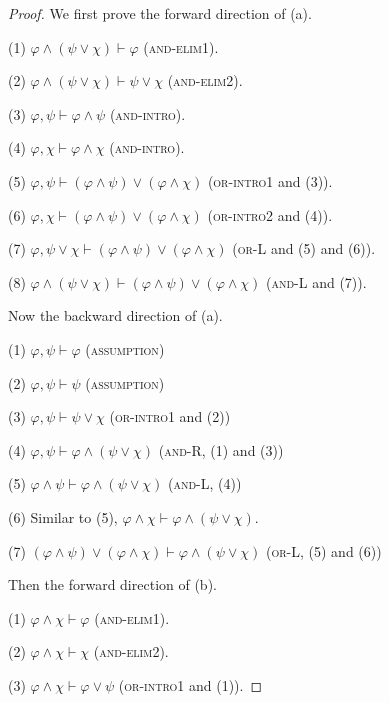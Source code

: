 \begin{proof}
    We first prove the forward direction of (a). 

    (1) $\varphi\wedge(\psi\vee\chi)\vdash\varphi$ (\textsc{and-elim1}). 
    
    (2) $\varphi\wedge(\psi\vee\chi)\vdash\psi\vee\chi$ (\textsc{and-elim2}). 
    
    (3) $\varphi,\psi\vdash\varphi\wedge\psi$ (\textsc{and-intro}). 
    
    (4) $\varphi,\chi\vdash\varphi\wedge\chi$ (\textsc{and-intro}). 
    
    (5) $\varphi,\psi\vdash(\varphi\wedge\psi)\vee(\varphi\wedge\chi)$ (\textsc{or-intro1} and (3)). 
    
    (6) $\varphi,\chi\vdash(\varphi\wedge\psi)\vee(\varphi\wedge\chi)$ (\textsc{or-intro2} and (4)). 
    
    (7) $\varphi,\psi\vee\chi\vdash(\varphi\wedge\psi)\vee(\varphi\wedge\chi)$ (\textsc{or-L} and (5) and (6)). 
    
    (8) $\varphi\wedge(\psi\vee\chi)\vdash(\varphi\wedge\psi)\vee(\varphi\wedge\chi)$ (\textsc{and-L} and (7)).

    \mbox{}

    Now the backward direction of (a).

    (1) $\varphi,\psi\vdash\varphi$ (\textsc{assumption})

    (2) $\varphi,\psi\vdash\psi$ (\textsc{assumption})

    (3) $\varphi,\psi\vdash\psi\vee\chi$ (\textsc{or-intro1} and (2))

    (4) $\varphi,\psi\vdash\varphi\wedge(\psi\vee\chi)$ (\textsc{and-R}, (1) and (3))

    (5) $\varphi\wedge\psi\vdash\varphi\wedge(\psi\vee\chi)$ (\textsc{and-L}, (4))

    (6) Similar to (5), $\varphi\wedge\chi\vdash\varphi\wedge(\psi\vee\chi)$.

    (7) $(\varphi\wedge\psi)\vee(\varphi\wedge\chi)\vdash\varphi\wedge(\psi\vee\chi)$ (\textsc{or-L}, (5) and (6))

    \mbox{}

    Then the forward direction of (b). 

    (1) $\varphi\wedge\chi\vdash\varphi$ (\textsc{and-elim1}). 
    
    (2) $\varphi\wedge\chi\vdash\chi$ (\textsc{and-elim2}). 
    
    (3) $\varphi\wedge\chi\vdash\varphi\vee\psi$ (\textsc{or-intro1} and (1)). 
    

\end{proof}
